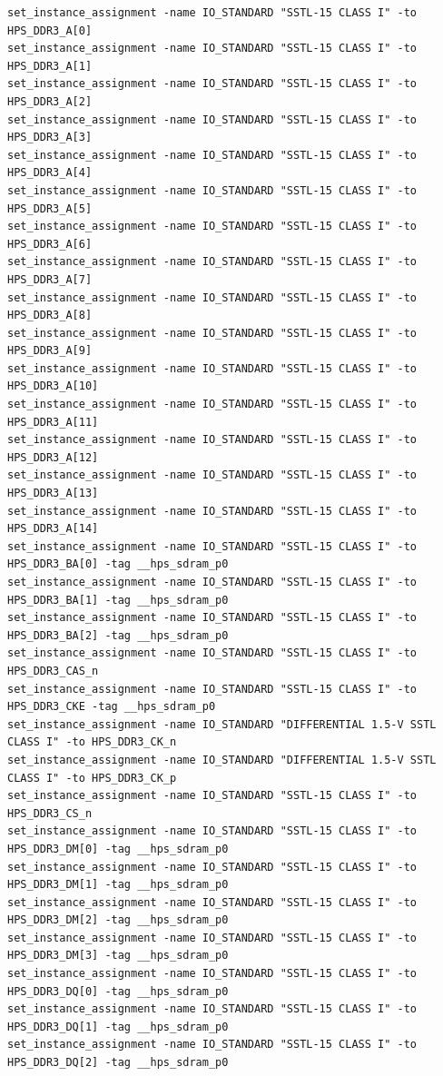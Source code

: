 \documentclass[conference]{IEEEtran}
\begin{document}
\begin{lstlisting}
set_instance_assignment -name IO_STANDARD "SSTL-15 CLASS I" -to HPS_DDR3_A[0]
set_instance_assignment -name IO_STANDARD "SSTL-15 CLASS I" -to HPS_DDR3_A[1]
set_instance_assignment -name IO_STANDARD "SSTL-15 CLASS I" -to HPS_DDR3_A[2]
set_instance_assignment -name IO_STANDARD "SSTL-15 CLASS I" -to HPS_DDR3_A[3]
set_instance_assignment -name IO_STANDARD "SSTL-15 CLASS I" -to HPS_DDR3_A[4]
set_instance_assignment -name IO_STANDARD "SSTL-15 CLASS I" -to HPS_DDR3_A[5]
set_instance_assignment -name IO_STANDARD "SSTL-15 CLASS I" -to HPS_DDR3_A[6]
set_instance_assignment -name IO_STANDARD "SSTL-15 CLASS I" -to HPS_DDR3_A[7]
set_instance_assignment -name IO_STANDARD "SSTL-15 CLASS I" -to HPS_DDR3_A[8]
set_instance_assignment -name IO_STANDARD "SSTL-15 CLASS I" -to HPS_DDR3_A[9]
set_instance_assignment -name IO_STANDARD "SSTL-15 CLASS I" -to HPS_DDR3_A[10]
set_instance_assignment -name IO_STANDARD "SSTL-15 CLASS I" -to HPS_DDR3_A[11]
set_instance_assignment -name IO_STANDARD "SSTL-15 CLASS I" -to HPS_DDR3_A[12]
set_instance_assignment -name IO_STANDARD "SSTL-15 CLASS I" -to HPS_DDR3_A[13]
set_instance_assignment -name IO_STANDARD "SSTL-15 CLASS I" -to HPS_DDR3_A[14]
set_instance_assignment -name IO_STANDARD "SSTL-15 CLASS I" -to HPS_DDR3_BA[0] -tag __hps_sdram_p0
set_instance_assignment -name IO_STANDARD "SSTL-15 CLASS I" -to HPS_DDR3_BA[1] -tag __hps_sdram_p0
set_instance_assignment -name IO_STANDARD "SSTL-15 CLASS I" -to HPS_DDR3_BA[2] -tag __hps_sdram_p0
set_instance_assignment -name IO_STANDARD "SSTL-15 CLASS I" -to HPS_DDR3_CAS_n
set_instance_assignment -name IO_STANDARD "SSTL-15 CLASS I" -to HPS_DDR3_CKE -tag __hps_sdram_p0
set_instance_assignment -name IO_STANDARD "DIFFERENTIAL 1.5-V SSTL CLASS I" -to HPS_DDR3_CK_n
set_instance_assignment -name IO_STANDARD "DIFFERENTIAL 1.5-V SSTL CLASS I" -to HPS_DDR3_CK_p
set_instance_assignment -name IO_STANDARD "SSTL-15 CLASS I" -to HPS_DDR3_CS_n
set_instance_assignment -name IO_STANDARD "SSTL-15 CLASS I" -to HPS_DDR3_DM[0] -tag __hps_sdram_p0
set_instance_assignment -name IO_STANDARD "SSTL-15 CLASS I" -to HPS_DDR3_DM[1] -tag __hps_sdram_p0
set_instance_assignment -name IO_STANDARD "SSTL-15 CLASS I" -to HPS_DDR3_DM[2] -tag __hps_sdram_p0
set_instance_assignment -name IO_STANDARD "SSTL-15 CLASS I" -to HPS_DDR3_DM[3] -tag __hps_sdram_p0
set_instance_assignment -name IO_STANDARD "SSTL-15 CLASS I" -to HPS_DDR3_DQ[0] -tag __hps_sdram_p0
set_instance_assignment -name IO_STANDARD "SSTL-15 CLASS I" -to HPS_DDR3_DQ[1] -tag __hps_sdram_p0
set_instance_assignment -name IO_STANDARD "SSTL-15 CLASS I" -to HPS_DDR3_DQ[2] -tag __hps_sdram_p0

\end{lstlisting}
\end{document}
